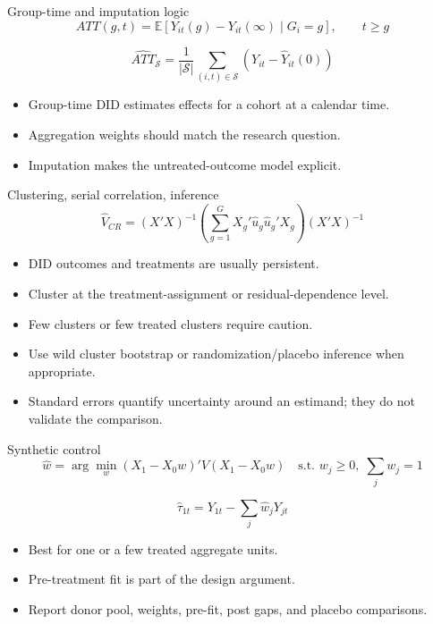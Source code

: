 \documentclass[aspectratio=169,11pt]{beamer}
\newcommand{\E}{\mathbb{E}}
\newcommand{\1}{\mathbf{1}}
\begin{document}
\begin{frame}{Group-time and imputation logic}
\[
ATT(g,t)
=
\E[Y_{it}(g)-Y_{it}(\infty)\mid G_i=g],
\qquad t\ge g
\]

\[
\widehat{ATT}_{\mathcal{S}}
=
\frac{1}{|\mathcal{S}|}
\sum_{(i,t)\in \mathcal{S}}
\left(Y_{it}-\widehat{Y}_{it}(0)\right)
\]

\begin{itemize}
    \item Group-time DID estimates effects for a cohort at a calendar time.
    \item Aggregation weights should match the research question.
    \item Imputation makes the untreated-outcome model explicit.
\end{itemize}
\end{frame}

\begin{frame}{Clustering, serial correlation, inference}
\[
\widehat{V}_{CR}
=
(X'X)^{-1}
\left(\sum_{g=1}^{G}X_g'\widehat{u}_g\widehat{u}_g'X_g\right)
(X'X)^{-1}
\]

\begin{itemize}
    \item DID outcomes and treatments are usually persistent.
    \item Cluster at the treatment-assignment or residual-dependence level.
    \item Few clusters or few treated clusters require caution.
    \item Use wild cluster bootstrap or randomization/placebo inference when appropriate.
    \item Standard errors quantify uncertainty around an estimand; they do not validate the comparison.
\end{itemize}
\end{frame}

\begin{frame}{Synthetic control}
\[
\widehat{w}
=
\arg\min_w (X_1-X_0w)'V(X_1-X_0w)
\quad
\text{s.t. } w_j\ge 0,\; \sum_j w_j=1
\]

\[
\widehat{\tau}_{1t}
=
Y_{1t}-\sum_j \widehat{w}_jY_{jt}
\]

\begin{itemize}
    \item Best for one or a few treated aggregate units.
    \item Pre-treatment fit is part of the design argument.
    \item Report donor pool, weights, pre-fit, post gaps, and placebo comparisons.
\end{itemize}
\end{frame}
\end{document}
